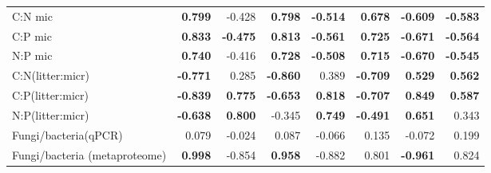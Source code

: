 \documentclass[10pt]{article}
\begin{document}
\begin{flushleft}
\begin{landscape}
\begin{table}[h!]
{\begin{tabular}{lrrrrrrr}
  C:N mic & \textbf{ 0.799 } & -0.428 & \textbf{ 0.798 } & \textbf{ -0.514 } & \textbf{ 0.678 } & \textbf{ -0.609 } & \textbf{ -0.583 } \\ 
  C:P mic & \textbf{ 0.833 } & \textbf{ -0.475 } & \textbf{ 0.813 } & \textbf{ -0.561 } & \textbf{ 0.725 } & \textbf{ -0.671 } & \textbf{ -0.564 } \\ 
  N:P mic & \textbf{ 0.740 } & -0.416 & \textbf{ 0.728 } & \textbf{ -0.508 } & \textbf{ 0.715 } & \textbf{ -0.670 } & \textbf{ -0.545 } \\ 
  C:N(litter:micr) & \textbf{ -0.771 } & 0.285 & \textbf{ -0.860 } & 0.389 & \textbf{ -0.709 } & \textbf{ 0.529 } & \textbf{ 0.562 } \\ 
  C:P(litter:micr) & \textbf{ -0.839 } & \textbf{ 0.775 } & \textbf{ -0.653 } & \textbf{ 0.818 } & \textbf{ -0.707 } & \textbf{ 0.849 } & \textbf{ 0.587 } \\ 
  N:P(litter:micr) & \textbf{ -0.638 } & \textbf{ 0.800 } & -0.345 & \textbf{ 0.749 } & \textbf{ -0.491 } & \textbf{ 0.651 } & 0.343 \\ 
  Fungi/bacteria(qPCR) & 0.079 & -0.024 & 0.087 & -0.066 & 0.135 & -0.072 & 0.199 \\ 
  Fungi/bacteria (metaproteome) & \textbf{ 0.998 } & -0.854 & \textbf{ 0.958 } & -0.882 & 0.801 & \textbf{ -0.961 } & 0.824 \\ 
   \hline
\end{tabular}
}
\end{table}



\end{landscape}
\end{flushleft}
\end{document}
